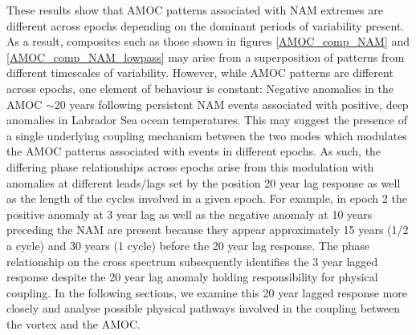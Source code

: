 These results show that AMOC patterns associated with NAM extremes are different across epochs depending on the dominant periods of variability present. As a result, composites such as those shown in figures \ref{AMOC_comp_NAM} and \ref{AMOC_comp_NAM_lowpass} may arise from a superposition of patterns from different timescales of variability. However, while AMOC patterns are different across epochs, one element of behaviour is constant: Negative anomalies in the AMOC $\sim$20 years following persistent NAM events associated with positive, deep anomalies in Labrador Sea ocean temperatures. This may suggest the presence of a single underlying coupling mechanism between the two modes which modulates the AMOC patterns associated with events in different epochs. As such, the differing phase relationships across epochs arise from this modulation with anomalies at different leads/lags set by the position 20 year lag response as well as the length of the cycles involved in a given epoch. For example, in epoch 2 the positive anomaly at 3 year lag as well as the negative anomaly at 10 years preceding the NAM are present because they appear approximately 15 years (1/2 a cycle) and 30 years (1 cycle) before the 20 year lag response. The phase relationship on the cross spectrum subsequently identifies the 3 year lagged response despite the 20 year lag anomaly holding responsibility for physical coupling. In the following sections, we examine this 20 year lagged response more closely and analyse possible physical pathways involved in the coupling between the vortex and the AMOC.











